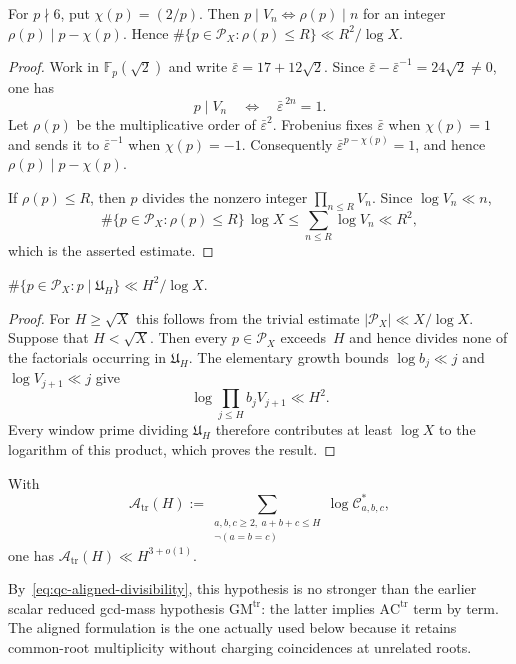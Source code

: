 \begin{lemma}\label{lem:qc-rank}
For $p\nmid6$, put $\chi(p)=(2/p)$.  Then
$p\mid V_n\iff\rho(p)\mid n$ for an integer
$\rho(p)\mid p-\chi(p)$.  Hence
$\#\{p\in\mathcal P_X:\rho(p)\le R\}\ll R^2/\log X$.
\end{lemma}

\begin{proof}
Work in $\mathbb F_p(\sqrt2)$ and write
$\bar\varepsilon=17+12\sqrt2$.  Since
$\bar\varepsilon-\bar\varepsilon^{-1}=24\sqrt2\ne0$, one has
\[
 p\mid V_n\quad\Longleftrightarrow\quad
 \bar\varepsilon^{\,2n}=1.
\]
Let $\rho(p)$ be the multiplicative order of
$\bar\varepsilon^2$.  Frobenius fixes $\bar\varepsilon$ when
$\chi(p)=1$ and sends it to $\bar\varepsilon^{-1}$ when
$\chi(p)=-1$.  Consequently
$\bar\varepsilon^{p-\chi(p)}=1$, and hence
$\rho(p)\mid p-\chi(p)$.

If $\rho(p)\le R$, then $p$ divides the nonzero integer
$\prod_{n\le R}V_n$.  Since $\log V_n\ll n$,
\[
 \#\{p\in\mathcal P_X:\rho(p)\le R\}\,\log X
 \le \sum_{n\le R}\log V_n\ll R^2,
\]
which is the asserted estimate.
\end{proof}

\begin{lemma}\label{lem:qc-exceptional}
$\#\{p\in\mathcal P_X:p\mid\mathfrak U_H\}\ll H^2/\log X$.
\end{lemma}

\begin{proof}
For $H\ge\sqrt X$ this follows from the trivial estimate
$|\mathcal P_X|\ll X/\log X$.  Suppose that $H<\sqrt X$.
Then every $p\in\mathcal P_X$ exceeds~$H$ and hence divides none of
the factorials occurring in $\mathfrak U_H$.  The elementary growth
bounds $\log b_j\ll j$ and $\log V_{j+1}\ll j$ give
\[
 \log\prod_{j\le H}b_jV_{j+1}\ll H^2.
\]
Every window prime dividing $\mathfrak U_H$ therefore contributes at
least $\log X$ to the logarithm of this product, which proves the
result.
\end{proof}

\begin{hypothesis}\label{hyp:qc-ac}
With
\[
 \mathcal A_{\mathrm{tr}}(H)
 :=
 \sum_{\substack{a,b,c\ge2,\ a+b+c\le H\\
                   \neg(a=b=c)}}
 \log \mathcal C^*_{a,b,c},
\]
one has $\mathcal A_{\mathrm{tr}}(H)\ll H^{3+o(1)}$.
\end{hypothesis}

By~\eqref{eq:qc-aligned-divisibility}, this hypothesis is no stronger
than the earlier scalar reduced gcd-mass hypothesis
$\mathrm{GM}^{\mathrm{tr}}$: the latter implies
$\mathrm{AC}^{\mathrm{tr}}$ term by term.  The aligned formulation is the
one actually used below because it retains common-root multiplicity
without charging coincidences at unrelated roots.

